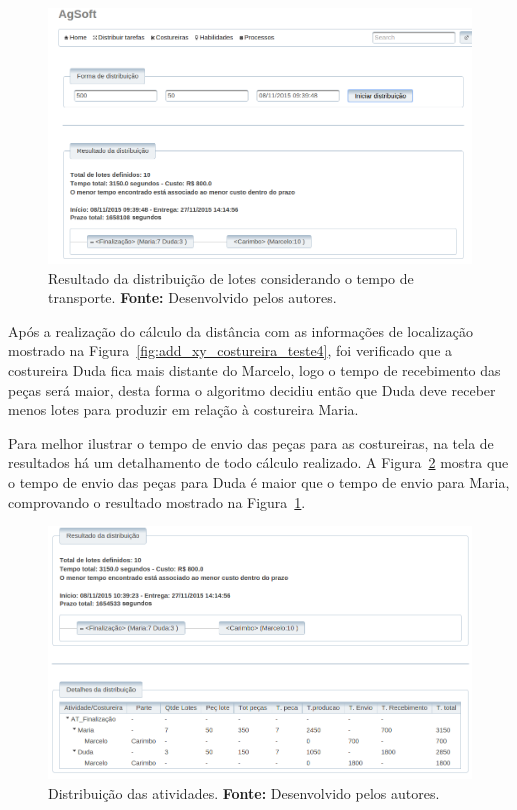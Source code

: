 \newpage

\begin{figure}[h!]
	\centerline{\includegraphics[width=13cm]{./imagens/resultado_transporte_teste4.png}}
	\caption[Resultado da distribuição de lotes considerando o tempo de transporte.]
	{Resultado da distribuição de lotes considerando o tempo de transporte. \textbf{Fonte:} Desenvolvido pelos
	autores.}
	\label{fig:resultado_transporte_teste4}
\end{figure}

\par Após a realização do cálculo da distância com as informações de localização mostrado na Figura~\ref{fig:add_xy_costureira_teste4}, 
foi verificado que a costureira Duda fica mais distante do Marcelo, logo o tempo de recebimento das peças será maior, desta forma o 
algoritmo decidiu então que Duda deve receber menos lotes para produzir em relação à costureira Maria.

\par Para melhor ilustrar o tempo de envio das peças para as costureiras, na tela
de resultados há um detalhamento de todo cálculo realizado. A
Figura~\ref{fig:detalhameneto_transporte_teste4} mostra que o tempo de envio das peças para Duda é 
maior que o tempo de envio para Maria, comprovando o resultado mostrado na
Figura~\ref{fig:resultado_transporte_teste4}.

\begin{figure}[h!]
	\centerline{\includegraphics[width=13.5cm]{./imagens/detalhamento_transporte_teste4.png}}
	\caption[Distribuição das atividades.] 
	{Distribuição das atividades. \textbf{Fonte:} Desenvolvido pelos autores.}
	\label{fig:detalhameneto_transporte_teste4}
\end{figure}

